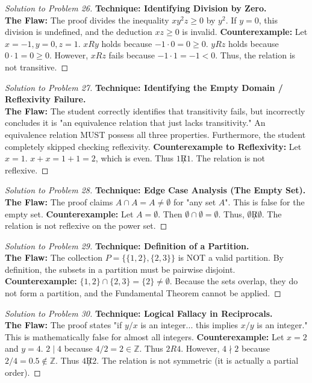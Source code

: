\documentclass[11pt, a4paper]{article}
\theoremstyle{definition}
\theoremstyle{remark}
\newcommand{\Z}{\mathbb{Z}}
\begin{document}
\begin{proof}[Solution to Problem 26]
    \textbf{Technique: Identifying Division by Zero.} \\
    \textbf{The Flaw:} The proof divides the inequality $xy^2z \ge 0$ by $y^2$. If $y = 0$, this division is undefined, and the deduction $xz \ge 0$ is invalid.
    \textbf{Counterexample:} Let $x = -1, y = 0, z = 1$.
    $xRy$ holds because $-1 \cdot 0 = 0 \ge 0$.
    $yRz$ holds because $0 \cdot 1 = 0 \ge 0$.
    However, $xRz$ fails because $-1 \cdot 1 = -1 < 0$. Thus, the relation is not transitive.
\end{proof}

\begin{proof}[Solution to Problem 27]
    \textbf{Technique: Identifying the Empty Domain / Reflexivity Failure.} \\
    \textbf{The Flaw:} The student correctly identifies that transitivity fails, but incorrectly concludes it is "an equivalence relation that just lacks transitivity." An equivalence relation MUST possess all three properties. Furthermore, the student completely skipped checking reflexivity.
    \textbf{Counterexample to Reflexivity:} Let $x = 1$. $x+x = 1+1 = 2$, which is even. Thus $1 \not R 1$. The relation is not reflexive.
\end{proof}

\begin{proof}[Solution to Problem 28]
    \textbf{Technique: Edge Case Analysis (The Empty Set).} \\
    \textbf{The Flaw:} The proof claims $A \cap A = A \neq \emptyset$ for "any set $A$". This is false for the empty set.
    \textbf{Counterexample:} Let $A = \emptyset$. Then $\emptyset \cap \emptyset = \emptyset$. Thus, $\emptyset \not R \emptyset$. The relation is not reflexive on the power set.
\end{proof}

\begin{proof}[Solution to Problem 29]
    \textbf{Technique: Definition of a Partition.} \\
    \textbf{The Flaw:} The collection $P = \{\{1, 2\}, \{2, 3\}\}$ is NOT a valid partition. By definition, the subsets in a partition must be pairwise disjoint.
    \textbf{Counterexample:} $\{1, 2\} \cap \{2, 3\} = \{2\} \neq \emptyset$. Because the sets overlap, they do not form a partition, and the Fundamental Theorem cannot be applied.
\end{proof}

\begin{proof}[Solution to Problem 30]
    \textbf{Technique: Logical Fallacy in Reciprocals.} \\
    \textbf{The Flaw:} The proof states "if $y/x$ is an integer... this implies $x/y$ is an integer." This is mathematically false for almost all integers.
    \textbf{Counterexample:} Let $x = 2$ and $y = 4$. $2 \mid 4$ because $4/2 = 2 \in \Z$. Thus $2R4$. However, $4 \nmid 2$ because $2/4 = 0.5 \notin \Z$. Thus $4 \not R 2$. The relation is not symmetric (it is actually a partial order).
\end{proof}
\end{document}
